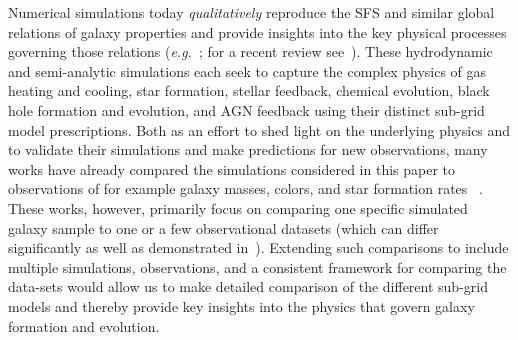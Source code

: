 \documentclass[preprint2,tighten]{aastex62}
\newcommand{\todo}[1]{{\bf \textcolor{red}{ #1}}}
\begin{document}
Numerical simulations today \emph{qualitatively} reproduce the SFS and 
similar global relations of galaxy properties and provide insights into the key physical processes governing those relations 
(\emph{e.g.}~\citealt{ vogelsberger2014,genel2014, schaye2015, dave2017}; 
for a recent review see~\citealt{somerville2015}). These hydrodynamic and 
semi-analytic simulations each seek to capture the complex physics of 
gas heating and cooling, star formation, stellar feedback, chemical 
evolution, black hole formation and evolution, and AGN feedback using 
their distinct sub-grid model prescriptions. Both as an effort to shed 
light on the underlying physics and to validate their simulations and make predictions for new observations, many 
works have already compared the simulations considered in this paper to 
observations of for example galaxy masses, colors, and star formation rates ~\citep[\emph{e.g.}][]{vogelsberger2014, 
genel2014, torrey2014, sparre2015, schaye2015, bluck2016, dave2017, somerville2015}. 
These works, however, primarily focus on comparing one specific simulated 
galaxy sample to one or a few observational datasets (which can differ significantly as well as demonstrated in~\citealt{speagle2014}). Extending such 
comparisons to include multiple simulations, observations, and a 
consistent framework for comparing the data-sets would allow us to make 
detailed comparison of the different sub-grid models and thereby provide 
key insights into the physics that govern galaxy formation and evolution.  

\end{document}
